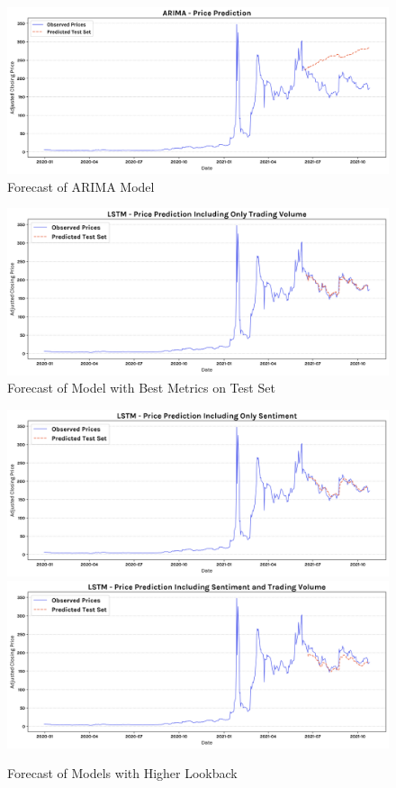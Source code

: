 \documentclass[11pt, a4paper]{article}
\begin{document}
\begin{figure}[!htb]
    \centering
    \includegraphics[width=\textwidth]{prediction_arima_pred.png}
    \caption{Forecast of ARIMA Model}
    \label{fig:arima_prediction_test_set}
\end{figure}

\begin{figure}[!htb]
    \centering
    \includegraphics[width=\textwidth]{only_trading_volume_pred.png}
    \caption{Forecast of Model with Best Metrics on Test Set}
    \label{fig:model_only_trading_volume_forecast_test_set}
\end{figure}

\begin{figure}[!htb]
    \centering
    \includegraphics[width=\textwidth]{only_sentiment_pred.png}
    \includegraphics[width=\textwidth]{all_features_pred.png}
    \caption{Forecast of Models with Higher Lookback}
    \label{fig:high_lookback}
\end{figure}
\end{document}
